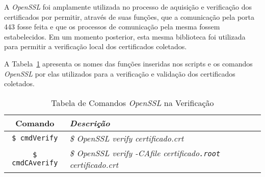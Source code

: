 		A \textit{OpenSSL} foi amplamente utilizada no processo de aquisição e verificação dos certificados por permitir, através de suas funções, que a comunicação pela porta 443  fosse feita e que os processos de comunicação pela mesma  fossem estabelecidos. Em um momento posterior, esta mesma biblioteca foi utilizada para permitir a verificação local dos certificados coletados.

		A Tabela~\ref{tab:cmds02} apresenta os nomes das funções inseridas nos scripts e os comandos \textit{OpenSSL} por elas utilizados para a verificação e validação dos certificados coletados.

	    \begin{table}[h]
			\centering
			\caption{Tabela de Comandos \textit{OpenSSL} na Verificação}
			\label{tab:cmds02}
			\begin{tabular}{c>{\em}l}
			\toprule
			\textbf{Comando} & \textbf{Descrição} \\ \midrule
			\texttt{\$ cmdVerify} & \$ \textit{OpenSSL} verify certificado.crt \\ 
			\rowcolor[gray]{0.9}
			\texttt{\$ cmdCAverify} & \$ \textit{OpenSSL} verify -CAfile certificado\texttt{.root} certificado.crt \\
			\bottomrule
			\end{tabular}
		\end{table}
